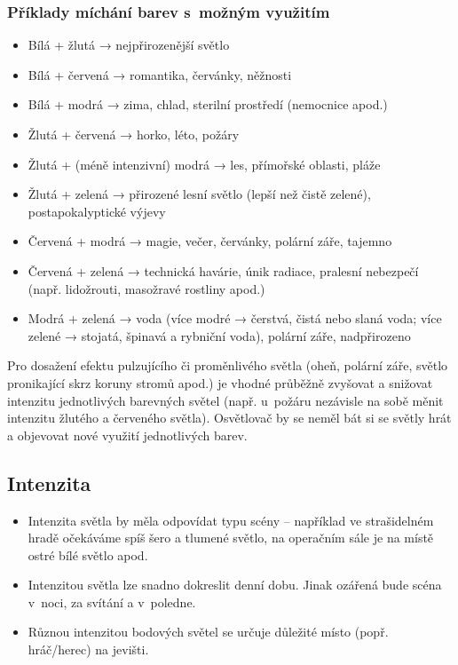 \subsubsection{ Příklady míchání barev s~možným využitím } \begin{itemize}
\item  Bílá + žlutá → nejpřirozenější světlo
\item  Bílá + červená → romantika, červánky, něžnosti
\item  Bílá + modrá → zima, chlad, sterilní prostředí (nemocnice apod.)
\item  Žlutá + červená → horko, léto, požáry
\item  Žlutá + (méně intenzivní) modrá → les, přímořské oblasti, pláže
\item  Žlutá + zelená → přirozené lesní světlo (lepší než čistě zelené), postapokalyptické výjevy
\item  Červená + modrá → magie, večer, červánky, polární záře, tajemno
\item  Červená + zelená → technická havárie, únik radiace, pralesní nebezpečí (např. lidožrouti, masožravé rostliny apod.)
\item  Modrá + zelená → voda  (více modré → čerstvá, čistá nebo slaná voda; více zelené → stojatá, špinavá a rybniční voda), polární záře, nadpřirozeno
\end{itemize}
 
 
	Pro dosažení efektu pulzujícího či proměnlivého světla (oheň, polární záře, světlo pronikající skrz koruny stromů apod.) je vhodné průběžně zvyšovat a snižovat intenzitu jednotlivých barevných světel (např. u~požáru nezávisle na sobě měnit intenzitu žlutého a červeného světla).  
	Osvětlovač by se neměl bát si se světly hrát a objevovat nové využití jednotlivých barev. 
 
\subsection{ Intenzita } \begin{itemize}
\item  Intenzita světla by měla odpovídat typu scény – například ve strašidelném hradě očekáváme spíš šero a tlumené světlo, na operačním sále je na místě ostré bílé světlo apod.
\item  Intenzitou světla lze snadno dokreslit denní dobu. Jinak ozářená bude scéna v~noci, za svítání a v~poledne.
\item  Různou intenzitou bodových světel se určuje důležité místo (popř. hráč/herec) na jevišti.
\end{itemize}
 
